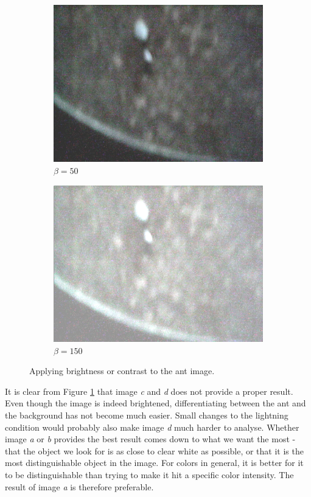\begin{figure}
\begin{subfigure}[b]{0.4\textwidth}
                \includegraphics[scale = 0.2]{img/bright50}
                \caption{$\beta = 50$}
        \end{subfigure}
		\quad
        \begin{subfigure}[b]{0.4\textwidth}
                \includegraphics[scale = 0.2]{img/bright150}
                \caption{$\beta = 150$}
        \end{subfigure}
		\caption{Applying brightness or contrast to the ant image.}
		\label{fig:contrast_ant}
\end{figure}

It is clear from Figure \ref{fig:contrast_ant} that image \emph{c} and \emph{d} does not provide a proper result. Even though the image is indeed brightened, differentiating between the ant and the background has not become much easier. Small changes to the lightning condition would probably also make image \emph{d} much harder to analyse. Whether image \emph{a} or \emph{b} provides the best result comes down to what we want the most - that the object we look for is as close to clear white as possible, or that it is the most distinguishable object in the image. For colors in general, it is better for it to be distinguishable than trying to make it hit a specific color intensity. The result of image \emph{a} is therefore preferable. \\

